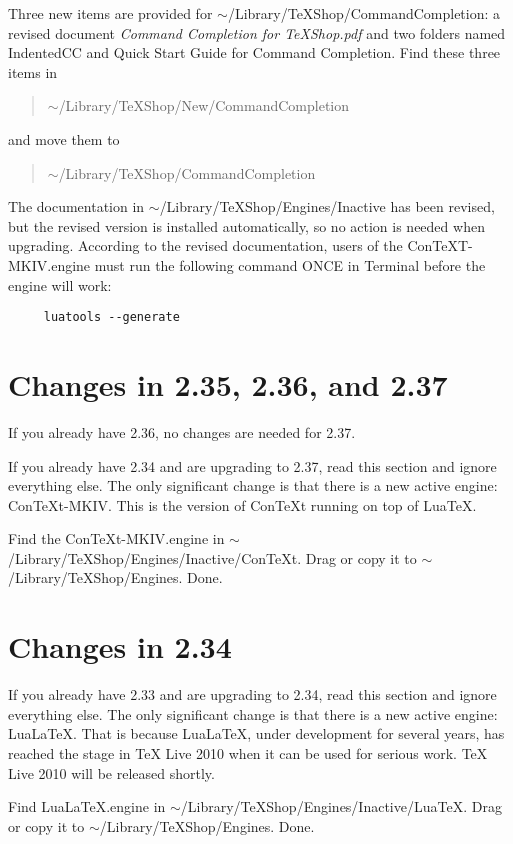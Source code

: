 \documentclass[11pt, oneside]{amsart}
\begin{document}
Three new items are provided for $\sim$/Library/TeXShop/CommandCompletion: a revised document {\em Command Completion for TeXShop.pdf}
and two folders named IndentedCC and Quick Start Guide for Command Completion. Find these three items in
\begin{quotation} 
$\sim$/Library/TeXShop/New/CommandCompletion
\end{quotation}
 and move them to 
 \begin{quotation}
 $\sim$/Library/TeXShop/CommandCompletion
 \end{quotation}

The documentation in $\sim$/Library/TeXShop/Engines/Inactive has been revised, but the revised version is installed automatically, so no action
is needed when upgrading. According to the revised documentation, users of the ConTeXT-MKIV.engine must run the following
command ONCE in Terminal before the engine will work:
\begin{verbatim}
     luatools --generate
\end{verbatim}


\section{Changes in 2.35, 2.36, and 2.37}


If you already have 2.36, no changes are needed for 2.37.

If you already have 2.34 and are upgrading to 2.37, read this section and ignore everything else. The only significant change is that there is a new active engine: ConTeXt-MKIV. This is the version of ConTeXt running on top of LuaTeX.

Find the ConTeXt-MKIV.engine in $\sim$/Library/TeXShop/Engines/Inactive/ConTeXt. Drag or copy it to $\sim$/Library/TeXShop/Engines. Done.


\section{Changes in 2.34}

If you already have 2.33 and are upgrading to 2.34, read this section and ignore everything else. The only significant change is that there is a new active engine: LuaLaTeX. That is because LuaLaTeX, under development for several years, has reached the stage in TeX Live 2010 when it can be used for serious work. TeX Live 2010 will be released shortly.

Find LuaLaTeX.engine in $\sim$/Library/TeXShop/Engines/Inactive/LuaTeX. Drag or copy it to $\sim$/Library/TeXShop/Engines. Done.
\end{document}
